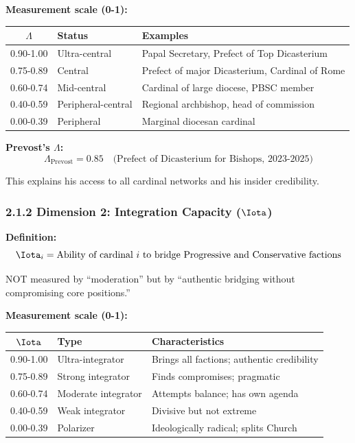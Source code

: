 \textbf{Measurement scale (0-1):}

\begin{table}[h]
\centering
\begin{tabular}{|c|l|l|}
\hline
$\Lambda$ & \textbf{Status} & \textbf{Examples} \\
\hline
0.90-1.00 & Ultra-central & Papal Secretary, Prefect of Top Dicasterium \\
0.75-0.89 & Central & Prefect of major Dicasterium, Cardinal of Rome \\
0.60-0.74 & Mid-central & Cardinal of large diocese, PBSC member \\
0.40-0.59 & Peripheral-central & Regional archbishop, head of commission \\
0.00-0.39 & Peripheral & Marginal diocesan cardinal \\
\hline
\end{tabular}
\end{table}

\textbf{Prevost's $\Lambda$:}
$$\Lambda_{\text{Prevost}} = 0.85 \quad \text{(Prefect of Dicasterium for Bishops, 2023-2025)}$$

This explains his access to all cardinal networks and his insider credibility.

\subsubsection{2.1.2 Dimension 2: Integration Capacity ($\Iota$)}

\textbf{Definition:}
$$\Iota_i = \text{Ability of cardinal } i \text{ to bridge Progressive and Conservative factions}$$

NOT measured by ``moderation'' but by ``authentic bridging without compromising core positions.''

\textbf{Measurement scale (0-1):}

\begin{table}[h]
\centering
\begin{tabular}{|c|l|l|}
\hline
$\Iota$ & \textbf{Type} & \textbf{Characteristics} \\
\hline
0.90-1.00 & Ultra-integrator & Brings all factions; authentic credibility \\
0.75-0.89 & Strong integrator & Finds compromises; pragmatic \\
0.60-0.74 & Moderate integrator & Attempts balance; has own agenda \\
0.40-0.59 & Weak integrator & Divisive but not extreme \\
0.00-0.39 & Polarizer & Ideologically radical; splits Church \\
\hline
\end{tabular}
\end{table}

